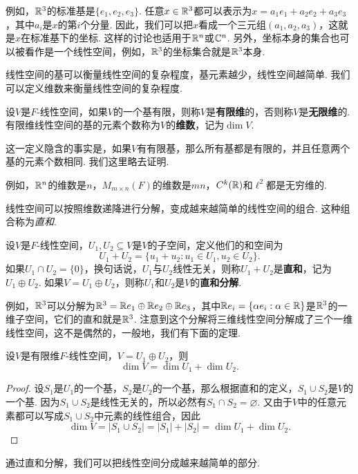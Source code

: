 例如，$\mathbb{R}^3$的标准基是$\{e_1,e_2,e_3\}$. 任意$x\in\mathbb{R}^3$都可以表示为$x=a_1e_1+a_2e_2+a_3e_3$，其中$a_i$是$x$的第$i$个分量. 因此，我们可以把$x$看成一个三元组$(a_1,a_2,a_3)$，这就是$x$在标准基下的坐标. 这样的讨论也适用于$\mathbb{R}^n$或$\mathbb{C}^n$. 另外，坐标本身的集合也可以被看作是一个线性空间，例如，$\mathbb{R}^3$的坐标集合就是$\mathbb{R}^3$本身. 

线性空间的基可以衡量线性空间的复杂程度，基元素越少，线性空间越简单. 我们可以定义维数来衡量线性空间的复杂程度. 

\begin{definition}[维数]
设$V$是$F$-线性空间，如果$V$的一个基有限，则称$V$是\textbf{有限维}的，否则称$V$是\textbf{无限维}的. 有限维线性空间的基的元素个数称为$V$的\textbf{维数}，记为$\dim V$. 
\end{definition}

这一定义隐含的事实是，如果$V$有有限基，那么所有基都是有限的，并且任意两个基的元素个数相同. 我们这里略去证明. 

例如，$\mathbb{R}^n$的维数是$n$，$M_{m\times n}(F)$的维数是$mn$，$C^k(\mathbb{R})$和$\ell^2$都是无穷维的. 

线性空间可以按照维数递降进行分解，变成越来越简单的线性空间的组合. 这种组合称为\textit{直和}. 

\begin{definition}[和空间与直和]
设$V$是$F$-线性空间，$U_1,U_2\subseteq V$是$V$的子空间，定义他们的和空间为
\[
    U_1+U_2=\{u_1+u_2:u_1\in U_1,u_2\in U_2\}.
\]
如果$U_1\cap U_2=\{0\}$，换句话说，$U_1$与$U_2$线性无关，则称$U_1+U_2$是\textbf{直和}，记为$U_1\oplus U_2$. 如果$V=U_1\oplus U_2$，则称$U_1$和$U_2$是$V$的\textbf{直和分解}. 
\end{definition}

例如，$\mathbb{R}^3$可以分解为$\mathbb{R}^3=\mathbb{R} e_1\oplus \mathbb{R} e_2\oplus \mathbb{R} e_3$，其中$\mathbb{R} e_i=\{\alpha e_i:\alpha\in\mathbb{R}\}$是$\mathbb{R}^3$的一维子空间，它们的直和就是$\mathbb{R}^3$. 注意到这个分解将三维线性空间分解成了三个一维线性空间，这不是偶然的，一般地，我们有下面的定理. 

\begin{theorem}[维数定理]\label{thm:dim-thm}
设$V$是有限维$F$-线性空间，$V=U_1\oplus U_2$，则
\[
    \dim V=\dim U_1+\dim U_2.
\]
\end{theorem}
\begin{proof}
    设$S_1$是$U_1$的一个基，$S_2$是$U_2$的一个基，那么根据直和的定义，$S_1\cup S_2$是$V$的一个基. 因为$S_1\cup S_2$是线性无关的，所以必然有$S_1\cap S_2=\varnothing$. 又由于$V$中的任意元素都可以写成$S_1\cup S_2$中元素的线性组合，因此
    \[
        \dim V=|S_1\cup S_2|=|S_1|+|S_2|=\dim U_1+\dim U_2.
    \]
\end{proof}
通过直和分解，我们可以把线性空间分成越来越简单的部分. 

